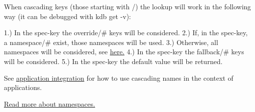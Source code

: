 When cascading keys (those starting with {\ttfamily /}) the lookup will work in the following way (it can be debugged with {\ttfamily kdb get -\/v})\+:

1.) In the {\ttfamily spec}-\/key the {\ttfamily override/\#} keys will be considered. 2.) If, in the {\ttfamily spec}-\/key, a {\ttfamily namespace/\#} exist, those namespaces will be used. 3.) Otherwise, all namespaces will be considered, see \hyperlink{md_doc_help_elektra-namespaces_doc_help_elektra-namespaces_md}{here.} 4.) In the {\ttfamily spec}-\/key the {\ttfamily fallback/\#} keys will be considered. 5.) In the {\ttfamily spec}-\/key the {\ttfamily default} value will be returned.

See \hyperlink{doc_tutorials_application-integration_md}{application integration} for how to use cascading names in the context of applications.

\hyperlink{md_doc_help_elektra-namespaces_doc_help_elektra-namespaces_md}{Read more about namespaces.} 